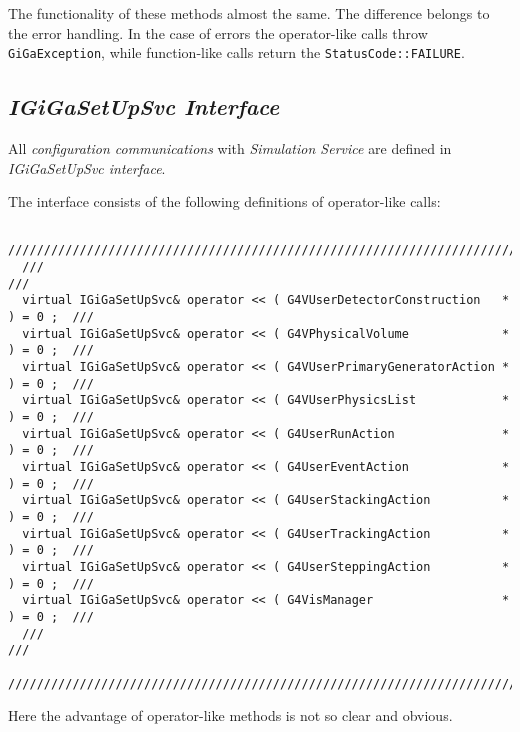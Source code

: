 \documentclass[nfss,times,12pt,a4paper]{article}
\begin{document}
{The functionality of these methods almost the same.
The difference belongs to the error handling. In the 
case of errors the operator-like calls throw  
{\tt GiGaException}, while function-like calls return
the {\tt StatusCode::FAILURE}.


\subsection  { \it IGiGaSetUpSvc Interface         }   

All {\it configuration communications} with {\it Simulation Service }
are defined in {\it IGiGaSetUpSvc interface}. 

The interface consists of the following definitions of operator-like calls:
\begin{tiny}
\begin{verbatim}
  /////////////////////////////////////////////////////////////////////////////////
  ///                                                                           /// 
  virtual IGiGaSetUpSvc& operator << ( G4VUserDetectorConstruction   * ) = 0 ;  ///
  virtual IGiGaSetUpSvc& operator << ( G4VPhysicalVolume             * ) = 0 ;  ///
  virtual IGiGaSetUpSvc& operator << ( G4VUserPrimaryGeneratorAction * ) = 0 ;  ///
  virtual IGiGaSetUpSvc& operator << ( G4VUserPhysicsList            * ) = 0 ;  ///
  virtual IGiGaSetUpSvc& operator << ( G4UserRunAction               * ) = 0 ;  ///
  virtual IGiGaSetUpSvc& operator << ( G4UserEventAction             * ) = 0 ;  ///
  virtual IGiGaSetUpSvc& operator << ( G4UserStackingAction          * ) = 0 ;  ///
  virtual IGiGaSetUpSvc& operator << ( G4UserTrackingAction          * ) = 0 ;  ///
  virtual IGiGaSetUpSvc& operator << ( G4UserSteppingAction          * ) = 0 ;  ///
  virtual IGiGaSetUpSvc& operator << ( G4VisManager                  * ) = 0 ;  ///
  ///                                                                           /// 
  /////////////////////////////////////////////////////////////////////////////////
\end{verbatim}  
\end{tiny}

Here the advantage of 
operator-like methods is not so clear and obvious. 

}
\end{document}
